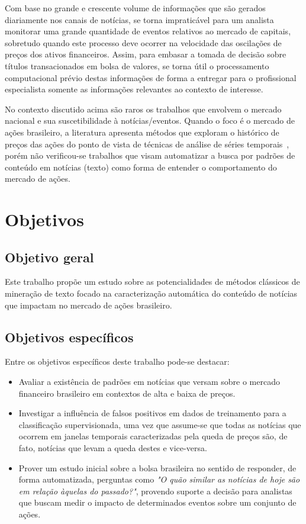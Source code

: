 \documentclass[11pt,a4paper]{article}
\begin{document}
Com base no grande e crescente volume de informações que são gerados diariamente nos canais de notícias, se torna
impraticável para um analista monitorar uma grande quantidade de eventos relativos ao mercado de capitais, sobretudo
quando este processo deve ocorrer na velocidade das oscilações de preços dos ativos financeiros. Assim, para embasar
a tomada de decisão sobre títulos transacionados em bolsa de valores, se torna útil o processamento computacional
prévio destas informações de forma a entregar para o profissional especialista somente as informações relevantes ao contexto de interesse.

No contexto discutido acima são raros os trabalhos que envolvem o mercado nacional e sua suscetibilidade à notícias/eventos.
Quando o foco é o mercado de ações brasileiro, a literatura apresenta métodos que exploram o histórico de preços das ações
do ponto de vista de técnicas de análise de séries temporais~\cite{Edgard:Dissertacao}, porém não verificou-se trabalhos
que visam automatizar a busca por padrões de conteúdo em notícias (texto) como forma de entender o comportamento do mercado de ações.

\section{Objetivos}\label{sec:objetivos}

\subsection{Objetivo geral}

Este trabalho propõe um estudo sobre as potencialidades de métodos clássicos de mineração de texto focado na caracterização
automática do conteúdo de notícias que impactam no mercado de ações brasileiro.

\subsection{Objetivos específicos}

Entre os objetivos específicos deste trabalho pode-se destacar:

\begin{itemize}
  \item Avaliar a existência de padrões em notícias que versam sobre o mercado financeiro
  brasileiro em contextos de alta e baixa de preços.
  \item Investigar a influência de falsos positivos em dados de treinamento para a classificação
  supervisionada, uma vez que assume-se que todas as notícias que ocorrem em janelas temporais
  caracterizadas pela queda de preços são, de fato, notícias que levam a queda destes e vice-versa.
  \item Prover um estudo inicial sobre a bolsa brasileira no sentido de responder, de forma
  automatizada, perguntas como \textit{"O quão similar as notícias de hoje são em relação àquelas do passado?"},
  provendo suporte a decisão para analistas que buscam medir o impacto de determinados eventos sobre um conjunto de ações.
\end{itemize}
\end{document}
